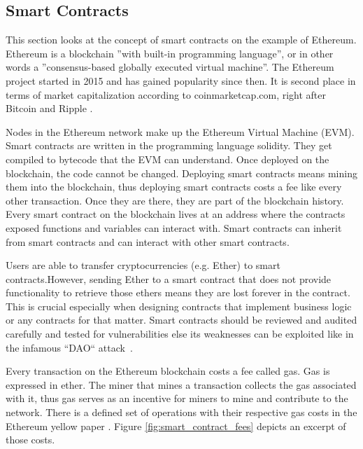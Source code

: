 \subsection{Smart Contracts}
\label{subsec:02_smart_contracts}

This section looks at the concept of smart contracts on the example of Ethereum.
Ethereum is a blockchain ''with built-in programming language'', or in other words a ''consensus-based globally executed virtual machine''.
The Ethereum project started in 2015 and has gained popularity since then. It is second place in terms of market capitalization according to coinmarketcap.com, right after Bitcoin and Ripple \cite{coinmarketcap}.

Nodes in the Ethereum network make up the Ethereum Virtual Machine (EVM). Smart contracts are written in the programming language solidity. They get compiled to bytecode that the EVM can understand.
Once deployed on the blockchain, the code cannot be changed. Deploying smart contracts means mining them into the blockchain, thus deploying smart contracts costs a fee like every other transaction. Once they are there, they are part of the blockchain history. Every smart contract on the blockchain lives at an address where the contracts exposed functions and variables can interact with. Smart contracts can inherit from smart contracts and can interact with other smart contracts.

Users are able to transfer cryptocurrencies (e.g. Ether) to smart contracts.However, sending Ether to a smart contract that does not provide functionality to retrieve those ethers means they are lost forever in the contract. This is crucial especially when designing contracts that implement business logic or any contracts for that matter. Smart contracts should be reviewed and audited carefully and tested for vulnerabilities else its weaknesses can be exploited like in the infamous ``DAO`` attack~\cite{DoaAttack}.

Every transaction on the Ethereum blockchain costs a fee called gas. Gas is expressed in ether. The miner that mines a transaction collects the gas associated with it, thus gas serves as an incentive for miners to mine and contribute to the network. There is a defined set of operations with their respective gas costs in the Ethereum yellow paper \cite{ethereumyellowpaer}.
Figure \ref{fig:smart_contract_fees} depicts an excerpt of those costs.

